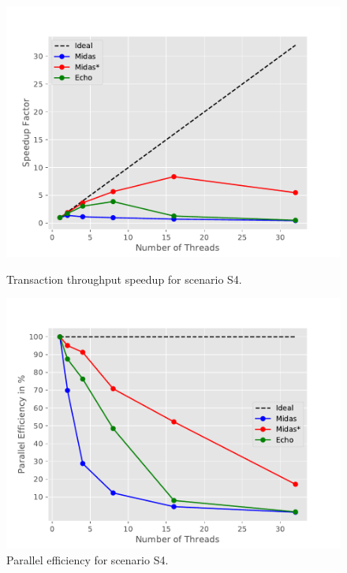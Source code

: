 \begin{figure}[h!]
\begin{minipage}[l]{0.50\textwidth}
    \includegraphics[width=\textwidth]{figures/bench/spd-ll}
    \caption{Transaction throughput speedup for scenario S4.}
    \label{fig:spd-s4}
\end{minipage}
\begin{minipage}[l]{0.50\textwidth}
    \includegraphics[width=\textwidth]{figures/bench/eff-ll}
    \caption{Parallel efficiency for scenario S4.}

\end{minipage}
\end{figure}

